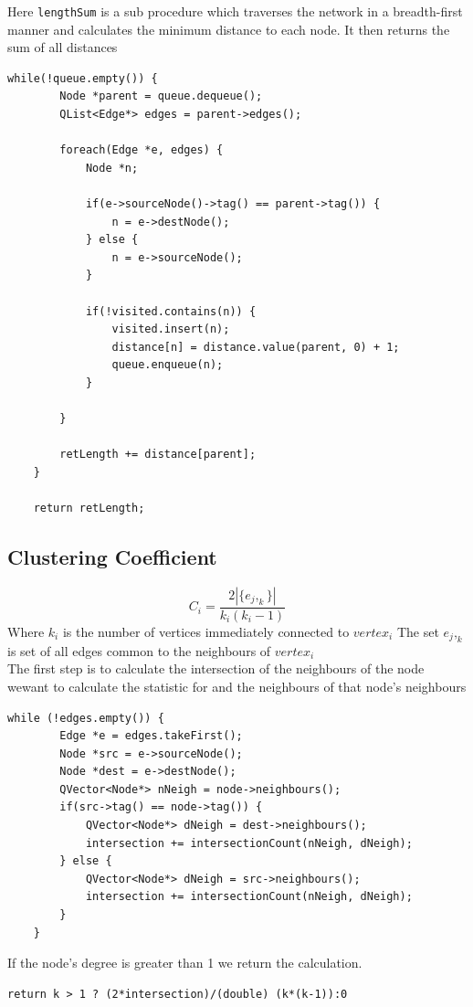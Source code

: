 \documentclass[a4paper,11pt,titlepage]{article}
\newcommand{\code}[1]{\texttt{#1}}
\begin{document}
Here \code{lengthSum} is a sub procedure which traverses the network in a
breadth-first manner and calculates the minimum distance to each node.
It then returns the sum of all distances
\begin{lstlisting}
while(!queue.empty()) {
        Node *parent = queue.dequeue();
        QList<Edge*> edges = parent->edges();

        foreach(Edge *e, edges) {
            Node *n;

            if(e->sourceNode()->tag() == parent->tag()) {
                n = e->destNode();
            } else {
                n = e->sourceNode();
            }

            if(!visited.contains(n)) {
                visited.insert(n);
                distance[n] = distance.value(parent, 0) + 1;
                queue.enqueue(n);
            }

        }

        retLength += distance[parent];
    }

    return retLength;
\end{lstlisting}

\subsection{Clustering Coefficient}
\[
C_i = \frac{2|\{e_j,_k\}|}{k_i(k_i-1)}
\]
Where $k_i$ is the number of vertices immediately connected to $vertex_i$
\newline
The set ${e_j,_k}$ is set of all edges common to the neighbours of $vertex_i$\\

The first step is to calculate the intersection of the neighbours of the node wewant to calculate the statistic for and the neighbours of that node's neighbours\begin{lstlisting}
while (!edges.empty()) {
        Edge *e = edges.takeFirst();
        Node *src = e->sourceNode();
        Node *dest = e->destNode();
        QVector<Node*> nNeigh = node->neighbours();
        if(src->tag() == node->tag()) {
            QVector<Node*> dNeigh = dest->neighbours();
            intersection += intersectionCount(nNeigh, dNeigh);
        } else {
            QVector<Node*> dNeigh = src->neighbours();
            intersection += intersectionCount(nNeigh, dNeigh);
        }
    }
\end{lstlisting}
If the node's degree is greater than 1 we return the calculation.
\begin{lstlisting}
return k > 1 ? (2*intersection)/(double) (k*(k-1)):0 
\end{lstlisting}
\end{document}
